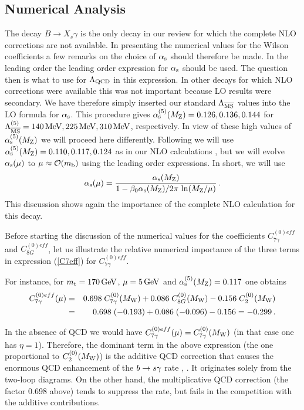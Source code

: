 \subsection{Numerical Analysis}
         \label{sec:Heff:BXsgamma:num}
The decay $B \to X_s \gamma$ is the only decay in our review for which
the complete NLO corrections are not available. In presenting the
numerical values for the Wilson coefficients a few remarks on the choice
of $\alpha_{\rm s}$ should therefore be made. In the leading order the leading
order expression for $\alpha_{\rm s}$ should be used. The question then is what to
use for $\Lambda_{\rm QCD}$ in this expression. In other decays for
which NLO corrections were available this was not important because LO
results were secondary. We have therefore simply inserted our standard
$\Lambda_{\overline{\rm MS}}$ values into the LO formula for $\alpha_{\rm s}$. This procedure gives
$\alpha_{\rm s}^{(5)}(M_{\rm Z})=0.126, 0.136, 0.144$ for $\Lambda_{\overline{\rm MS}}^{(5)}=140\, {\rm MeV},
225\, {\rm MeV}, 310\, {\rm MeV}$, respectively. In view of these high values of
$\alpha_{\rm s}^{(5)}(M_{\rm Z})$ we will proceed here differently. Following
\cite{BMMP:94} we will use $\alpha_{\rm s}^{(5)}(M_{\rm Z})=0.110, 0.117, 0.124$ as
in our NLO calculations , but we will evolve $\alpha_{\rm s}(\mu)$ to $\mu \approx
{\cal O}(m_{\rm b})$ using the leading order expressions. In short, we will use
\begin{equation} 
\alpha_{\rm s}(\mu) = \frac{\alpha_{\rm s}(M_{\rm Z})}{1 - \beta_0 \alpha_{\rm s}(M_{\rm Z})/2\pi \, \ln(M_{\rm Z}/\mu)} \, .
\label{eq:asmumz}
\end{equation} 
This discussion shows again the importance of the complete NLO
calculation for this decay.

Before starting the discussion of the numerical values for the
coefficients $C^{(0)eff}_{7\gamma}$ and $C^{(0)eff}_{8G}$, let us
illustrate the relative numerical importance of the three terms in
expression (\ref{C7eff}) for $C^{(0)eff}_{7\gamma}$. 

For instance, for $m_{\rm t} = 170\, {\rm GeV}$, $\mu = 5\, {\rm GeV}$ and $\alpha_{\rm s}^{(5)}(M_{\rm Z})
=0.117$ one obtains
\begin{eqnarray}
C^{(0)eff}_{7\gamma}(\mu) &=&
0.698 \; C^{(0)}_{7\gamma}(M_{\rm W}) +
0.086 \; C^{(0)}_{8G}(M_{\rm W}) - 0.156 \; C^{(0)}_2(M_{\rm W})
\nonumber\\
 &=& 0.698 \; (-0.193) + 0.086 \; (-0.096) - 0.156 = -0.299 \, .
\label{eq:C7geffnum}
\end{eqnarray}

In the absence of QCD we would have $C^{(0)eff}_{7\gamma}(\mu) =
C^{(0)}_{7\gamma}(M_{\rm W})$ (in that case one has $\eta = 1$). Therefore, the
dominant term in the above expression (the one proportional to
$C^{(0)}_2(M_{\rm W})$) is the additive QCD correction that causes the
enormous QCD enhancement of the $b \to s \gamma$ rate \cite{Bert}, \cite{Desh}.
It originates solely from the two-loop diagrams. On the other hand, the
multiplicative QCD correction (the factor 0.698 above) tends to
suppress the rate, but fails in the competition with the additive
contributions.


